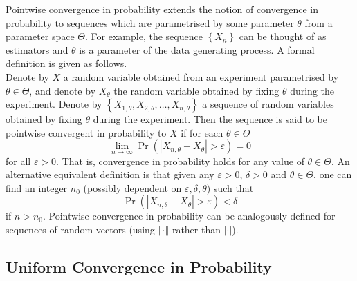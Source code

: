 \documentclass[11pt]{report} %
\begin{document}
Pointwise convergence in probability extends the notion of convergence in probability to sequences which are parametrised by some parameter $\theta$ from a parameter space $\Theta$. For example, the sequence $\left\{X_{n}\right\}$ can be thought of as estimators and $\theta$ is a parameter of the data generating process. A formal definition is given as follows. \\
 
Denote by $X$ a random variable obtained from an experiment parametrised by $\theta\in\Theta$, and denote by $X_{\theta}$ the random variable obtained by fixing $\theta$ during the experiment. Denote by $\left\{X_{1, \theta}, X_{2, \theta}, \dots, X_{n, \theta}\right\}$ a sequence of random variables obtained by fixing $\theta$ during the experiment. Then the sequence is said to be pointwise convergent in probability to $X$ if for each $\theta\in\Theta$
\begin{equation}
\lim_{n\to \infty}\operatorname{Pr}\left(\left|X_{n, \theta} - X_{\theta}\right| > \varepsilon\right) = 0
\end{equation}
for all $\varepsilon > 0$. That is, convergence in probability holds for any value of $\theta\in\Theta$. An alternative equivalent definition is that given any $\varepsilon > 0$, $\delta > 0$ and $\theta\in\Theta$, one can find an integer $n_{0}$ (possibly dependent on $\varepsilon, \delta, \theta$) such that
\begin{equation}
\operatorname{Pr}\left(\left|X_{n, \theta} - X_{\theta}\right| > \varepsilon\right) < \delta
\end{equation}
if $n > n_{0}$. Pointwise convergence in probability can be analogously defined for sequences of random vectors (using $\left\Vert\cdot\right\Vert$ rather than $\left|\cdot\right|$).

\subsection{Uniform Convergence in Probability}
\end{document}
